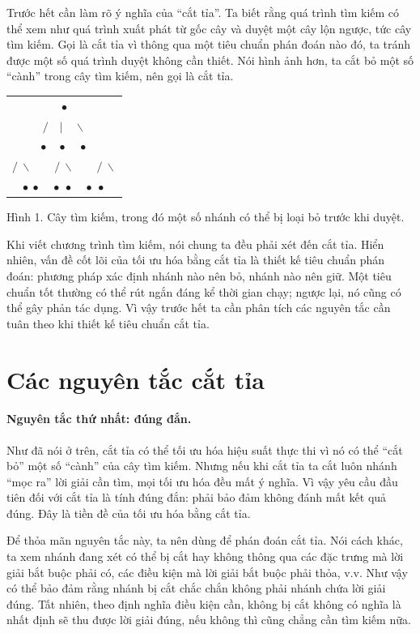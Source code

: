 \documentclass[11pt]{article}
\begin{document}
Trước hết cần làm rõ ý nghĩa của ``cắt tỉa''. Ta biết rằng quá trình tìm kiếm
có thể xem như quá trình xuất phát từ gốc cây và duyệt một cây lộn ngược,
tức cây tìm kiếm. Gọi là cắt tỉa vì thông qua một tiêu chuẩn phán đoán nào
đó, ta tránh được một số quá trình duyệt không cần thiết. Nói hình ảnh hơn,
ta cắt bỏ một số ``cành'' trong cây tìm kiếm, nên gọi là cắt tỉa.

\begin{center}
\begin{tabular}{c}
\(\bullet\)\\[-0.2em]
\(/\quad|\quad\backslash\)\\[-0.2em]
\(\bullet\quad\bullet\quad\bullet\)\\[-0.2em]
\(/\ \backslash\qquad /\ \backslash\qquad /\ \backslash\)\\[-0.2em]
\(\bullet\ \bullet\quad\bullet\ \bullet\quad\bullet\ \bullet\)
\end{tabular}

\smallskip
Hình 1. Cây tìm kiếm, trong đó một số nhánh có thể bị loại bỏ trước khi duyệt.
\end{center}

Khi viết chương trình tìm kiếm, nói chung ta đều phải xét đến cắt tỉa. Hiển
nhiên, vấn đề cốt lõi của tối ưu hóa bằng cắt tỉa là thiết kế tiêu chuẩn
phán đoán: phương pháp xác định nhánh nào nên bỏ, nhánh nào nên giữ. Một tiêu
chuẩn tốt thường có thể rút ngắn đáng kể thời gian chạy; ngược lại, nó cũng
có thể gây phản tác dụng. Vì vậy trước hết ta cần phân tích các nguyên tắc
cần tuân theo khi thiết kế tiêu chuẩn cắt tỉa.

\section{Các nguyên tắc cắt tỉa}

\paragraph{Nguyên tắc thứ nhất: đúng đắn.}
Như đã nói ở trên, cắt tỉa có thể tối ưu hóa hiệu suất thực thi vì nó có thể
``cắt bỏ'' một số ``cành'' của cây tìm kiếm. Nhưng nếu khi cắt tỉa ta cắt luôn
nhánh ``mọc ra'' lời giải cần tìm, mọi tối ưu hóa đều mất ý nghĩa. Vì vậy yêu
cầu đầu tiên đối với cắt tỉa là tính đúng đắn: phải bảo đảm không đánh mất
kết quả đúng. Đây là tiền đề của tối ưu hóa bằng cắt tỉa.

Để thỏa mãn nguyên tắc này, ta nên dùng  để phán đoán cắt
tỉa. Nói cách khác, ta xem nhánh đang xét có thể bị cắt hay không thông qua
các đặc trưng mà lời giải bắt buộc phải có, các điều kiện mà lời giải bắt
buộc phải thỏa, v.v. Như vậy có thể bảo đảm rằng nhánh bị cắt chắc chắn
không phải nhánh chứa lời giải đúng. Tất nhiên, theo định nghĩa điều kiện cần,
không bị cắt không có nghĩa là nhất định sẽ thu được lời giải đúng, nếu không
thì cũng chẳng cần tìm kiếm nữa.
\end{document}
